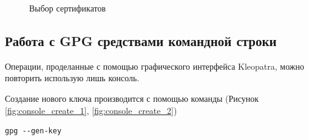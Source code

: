 \documentclass[10pt,a4paper]{article}
\begin{document}
\begin{figure}[h]
\begin{minipage}[h]{0.4\textwidth}
\end{minipage}
\caption{Выбор сертификатов}
\label{fig:encrypt_3}
\end{figure}

\subsection{Работа с GPG средствами командной строки}
\label{gpg_console}

Операции, проделанные с помощью графического интерфейса Kleopatra, можно повторить использую лишь консоль.

Создание нового ключа производится с помощью команды (Рисунок \ref{fig:console_create_1}, \ref{fig:console_create_2})
\begin{verbatim}
gpg --gen-key
\end{verbatim}
\end{document}
